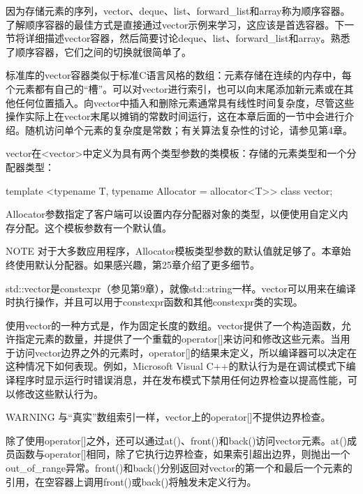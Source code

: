 
因为存储元素的序列，vector、deque、list、forward\_list和array称为顺序容器。了解顺序容器的最佳方式是直接通过vector示例来学习，这应该是首选容器。下一节将详细描述vector容器，然后简要讨论deque、list、forward\_list和array。熟悉了顺序容器，它们之间的切换就很简单了。


标准库的vector容器类似于标准C语言风格的数组：元素存储在连续的内存中，每个元素都有自己的“槽”。可以对vector进行索引，也可以向末尾添加新元素或在其他任何位置插入。向vector中插入和删除元素通常具有线性时间复杂度，尽管这些操作实际上在vector末尾以摊销的常数时间运行，这在本章后面的一节中会进行介绍。随机访问单个元素的复杂度是常数；有关算法复杂性的讨论，请参见第4章。


vector在<vector>中定义为具有两个类型参数的类模板：存储的元素类型和一个分配器类型：

\begin{cpp}
template <typename T, typename Allocator = allocator<T>> class vector;
\end{cpp}

Allocator参数指定了客户端可以设置内存分配器对象的类型，以便使用自定义内存分配。这个模板参数有一个默认值。

\begin{myNotic}{NOTE}
对于大多数应用程序，Allocator模板类型参数的默认值就足够了。本章始终使用默认分配器。如果感兴趣，第25章介绍了更多细节。
\end{myNotic}

std::vector是constexpr（参见第9章），就像std::string一样。vector可以用来在编译时执行操作，并且可以用于constexpr函数和其他constexpr类的实现。


使用vector的一种方式是，作为固定长度的数组。vector提供了一个构造函数，允许指定元素的数量，并提供了一个重载的operator[]来访问和修改这些元素。当用于访问vector边界之外的元素时，operator[]的结果未定义，所以编译器可以决定在这种情况下如何表现。例如，Microsoft Visual C++的默认行为是在调试模式下编译程序时显示运行时错误消息，并在发布模式下禁用任何边界检查以提高性能，可以修改这些默认行为。

\begin{myWarning}{WARNING}
与“真实”数组索引一样，vector上的operator[]不提供边界检查。
\end{myWarning}

除了使用operator[]之外，还可以通过at()、front()和back()访问vector元素。at()成员函数与operator[]相同，除了它执行边界检查，如果索引超出边界，则抛出一个out\_of\_range异常。front()和back()分别返回对vector的第一个和最后一个元素的引用，在空容器上调用front()或back()将触发未定义行为。

